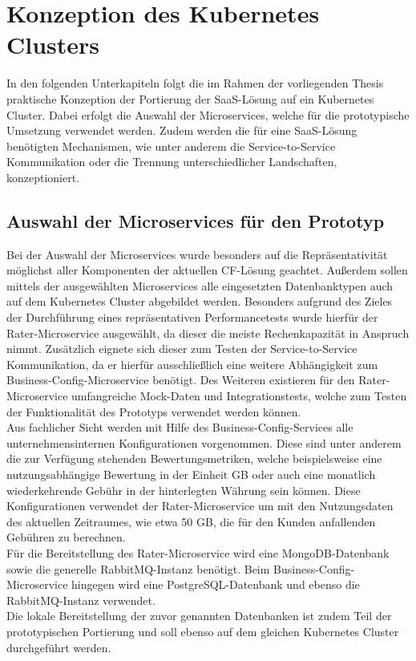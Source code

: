 \chapter{Konzeption des Kubernetes Clusters}
\label{Konzeption_K8s_Cluster}
In den folgenden Unterkapiteln folgt die im Rahmen der vorliegenden Thesis praktische Konzeption der Portierung der \ac{SaaS}-Lösung auf ein Kubernetes Cluster. Dabei erfolgt die Auswahl der Microservices, welche für die prototypische Umsetzung verwendet werden. Zudem werden die für eine \ac{SaaS}-Lösung benötigten Mechanismen, wie unter anderem die Service-to-Service Kommunikation oder die Trennung unterschiedlicher Landschaften, konzeptioniert.

\section{Auswahl der Microservices für den Prototyp}
\label{Konzeption_Auswahl_Microservices}
Bei der Auswahl der Microservices wurde besonders auf die Repräsentativität möglichst aller Komponenten der aktuellen \ac{CF}-Lösung geachtet. Außerdem sollen mittels der ausgewählten Microservices alle eingesetzten Datenbanktypen auch auf dem Kubernetes Cluster abgebildet werden. Besonders aufgrund des Zieles der Durchführung eines repräsentativen Performancetests wurde hierfür der Rater-Microservice ausgewählt, da dieser die meiste Rechenkapazität in Anspruch nimmt. Zusätzlich eignete sich dieser zum Testen der Service-to-Service Kommunikation, da er hierfür ausschließlich eine weitere Abhängigkeit zum Business-Config-Microservice benötigt. Des Weiteren existieren für den Rater-Microservice umfangreiche Mock-Daten und Integrationstests, welche zum Testen der Funktionalität des Prototyps verwendet werden können.\\
Aus fachlicher Sicht werden mit Hilfe des Business-Config-Services alle unternehmensinternen Konfigurationen vorgenommen. Diese sind unter anderem die zur Verfügung stehenden Bewertungsmetriken, welche beispielsweise eine nutzungsabhängige Bewertung in der Einheit \ac{GB} oder auch eine monatlich wiederkehrende Gebühr in der hinterlegten Währung sein können. Diese Konfigurationen verwendet der Rater-Microservice um mit den Nutzungsdaten des aktuellen Zeitraumes, wie etwa 50 \ac{GB}, die für den Kunden anfallenden Gebühren zu berechnen.\\
Für die Bereitstellung des Rater-Microservice wird eine MongoDB-Datenbank sowie die generelle RabbitMQ-Instanz benötigt. 
Beim Business-Config-Microservice hingegen wird eine PostgreSQL-Datenbank und ebenso die RabbitMQ-Instanz verwendet.\\
Die lokale Bereitstellung der zuvor genannten Datenbanken ist zudem Teil der prototypischen Portierung und soll ebenso auf dem gleichen Kubernetes Cluster durchgeführt werden. 

